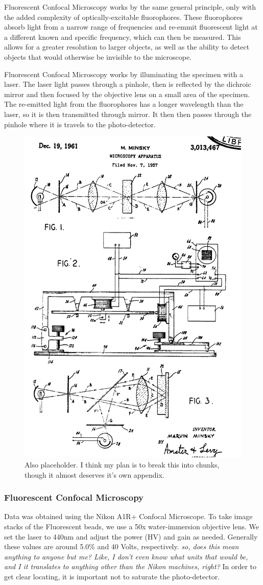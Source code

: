 Fluorescent Confocal Microscopy works by the same general principle, only with the added complexity of optically-excitable fluorophores. These fluorophores absorb light from a narrow range of frequencies and re-emmit fluorescent light at a different known and specific frequency, which can then be measured. This allows for a greater resolution to larger objects, as well as the ability to detect objects that would otherwise be invisible to the microscope.  

Fluorescent Confocal Microscopy works by illuminating the specimen with a laser. The laser light passes through a pinhole, then is reflected by the dichroic mirror and then focused by the objective lens on a small area of the specimen. The re-emitted light from the fluorophores has a longer wavelength than the laser, so it is then transmitted through mirror.  It then then passes through the pinhole where it is travels to the photo-detector.

\begin{figure}[h!]
	\centering
	\includegraphics[width=.3\linewidth]{confocal_stuff/confocalpatent}
	\caption[Minsky Patent Diagram]{Also placeholder. I think my plan is to break this into chunks, though it almost deserves it's own appendix.}
	\label{fig:confocalpatent}
\end{figure}
\cite{patent:3013467} 

\subsubsection{Fluorescent Confocal Microscopy}
Data was obtained using the Nikon A1R+ Confocal Microscope. To take image stacks of the Fluorescent beads, we use a 50x water-immersion objective lens. We set the laser to 440nm and adjust the power (HV) and gain as needed. Generally these values are around 5.0\% and 40 Volts, respectively. \emph{so, does this mean anything to anyone but me? Like, I don't even know what units that would be, and I it translates to anything other than the Nikon machines, right?} In order to get clear locating, it is important not to saturate the photo-detector. 

